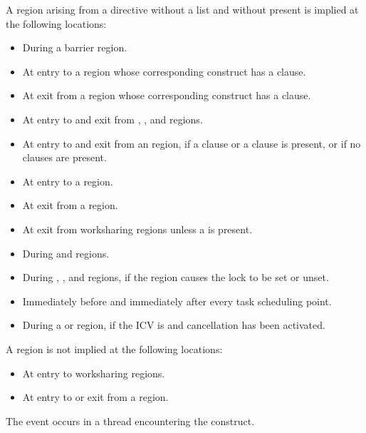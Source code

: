 A  region arising from a  directive without a list and
without  present is implied at the following locations:
\begin{itemize}
\item During a barrier region.
\item At entry to a  region whose corresponding construct has a  clause.
\item At exit from a  region whose corresponding construct has a  clause.
\item At entry to and exit from , ,  and  regions.
\item At entry to and exit from an  region, if a  clause or a  clause is present, or if no clauses are present.
\item At entry to a  region. 
\item At exit from a  region. 
\item At exit from worksharing regions unless a  is present.
\item During  and  regions.
\item During , ,  
and  regions, if the region causes the lock to be set or unset.
\item Immediately before and immediately after every task scheduling point.
\item During a  or  region, if the  ICV is  and cancellation has been activated.
\end{itemize}

\begin{note}
A  region is not implied at the following locations:

\begin{itemize}
\item At entry to worksharing regions.

\item At entry to or exit from a  region.
\end{itemize}
\end{note}

\events

The  event occurs in a thread encountering the
 construct.

